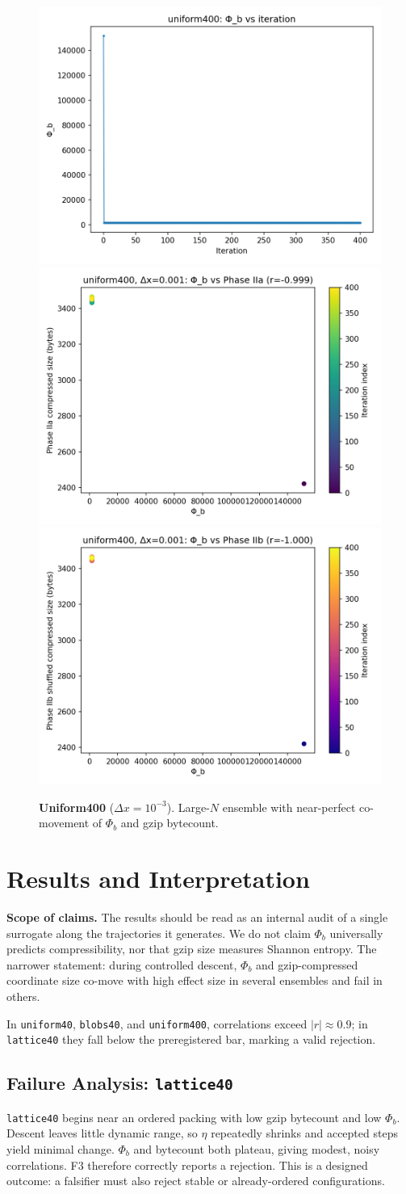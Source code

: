 \documentclass[11pt,a4paper]{article}
\numberwithin{equation}{section}
\newcommand{\phib}{\Phi_b}
\begin{document}
\begin{figure}[htbp]
\centering
\includegraphics[width=0.32\linewidth]{figures/uniform400_dx0.001_phib_vs_iter.png}
\includegraphics[width=0.32\linewidth]{figures/uniform400_dx0.001_phib_vs_phase2a.png}
\includegraphics[width=0.32\linewidth]{figures/uniform400_dx0.001_phib_vs_phase2b.png}
\caption{\textbf{Uniform400} ($\Delta x{=}10^{-3}$).  Large-$N$ ensemble with near-perfect co-movement of $\phib$ and gzip bytecount.}
\end{figure}

\section{Results and Interpretation}
\textbf{Scope of claims.}  
The results should be read as an internal audit of a single surrogate along the trajectories it generates.  We do not claim $\phib$ universally predicts compressibility, nor that gzip size measures Shannon entropy.  The narrower statement: during controlled descent, $\phib$ and gzip-compressed coordinate size co-move with high effect size in several ensembles and fail in others.

In \texttt{uniform40}, \texttt{blobs40}, and \texttt{uniform400}, correlations exceed $|r|\!\approx\!0.9$; in \texttt{lattice40} they fall below the preregistered bar, marking a valid rejection.

\subsection*{Failure Analysis: \texttt{lattice40}}
\texttt{lattice40} begins near an ordered packing with low gzip bytecount and low $\phib$.  Descent leaves little dynamic range, so $\eta$ repeatedly shrinks and accepted steps yield minimal change.  $\phib$ and bytecount both plateau, giving modest, noisy correlations.  F3 therefore correctly reports a rejection.  This is a designed outcome: a falsifier must also reject stable or already-ordered configurations.
\end{document}
